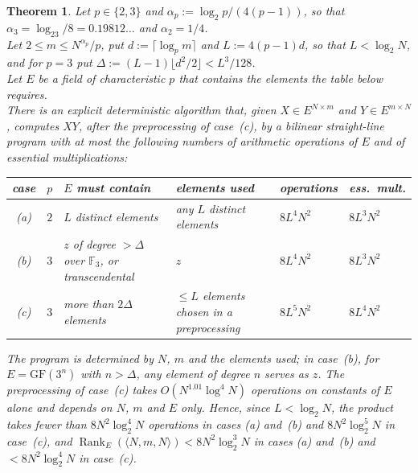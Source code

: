 \documentclass[11pt]{article}
\newtheorem{theorem}{Theorem}[section]
\theoremstyle{definition}
\theoremstyle{remark}
\newcommand{\F}{\mathbb{F}}
\newcommand{\GF}{\mathrm{GF}}
\newcommand{\Rank}{\operatorname{Rank}}
\begin{document}
\begin{theorem}\label{thm:main}
Let $p\in\{2,3\}$ and $\alpha_p:=\log_2p/(4(p-1))$, so that $\alpha_3=\log_23/8=0.19812\ldots$ and $\alpha_2=1/4$.\\
Let $2\le m\le N^{\alpha_p}/p$, put $d:=\lceil\log_pm\rceil$ and $L:=4(p-1)d$, so that $L<\log_2N$, and for $p=3$ put $\Delta:=(L-1)\lfloor d^2/2\rfloor<L^3/128$.\\
Let $E$ be a field of characteristic $p$ that contains the elements the table below requires.\\
There is an explicit deterministic algorithm that, given $X\in E^{N\times m}$ and $Y\in E^{m\times N}$, computes $XY$, after the preprocessing of case~(c), by a bilinear straight-line program with at most the following numbers of arithmetic operations of $E$ and of essential multiplications:
\begin{center}\small
\begin{tabular}{@{}cc>{\raggedright\arraybackslash}p{3.6cm}>{\raggedright\arraybackslash}p{3.6cm}ll@{}}
\toprule
case & $p$ & $E$ must contain & elements used & operations & ess.\ mult.\\
\midrule
(a) & $2$ & $L$ distinct elements & any $L$ distinct elements & $8L^4N^2$ & $8L^3N^2$\\
(b) & $3$ & $z$ of degree $>\Delta$ over $\F_3$, or transcendental & $z$ & $8L^4N^2$ & $8L^3N^2$\\
(c) & $3$ & more than $2\Delta$ elements & $\le L$ elements chosen in a preprocessing & $8L^5N^2$ & $8L^4N^2$\\
\bottomrule
\end{tabular}
\end{center}
The program is determined by $N$, $m$ and the elements used; in case~(b), for $E=\GF(3^n)$ with $n>\Delta$, any element of degree $n$ serves as $z$. The preprocessing of case~(c) takes $O(N^{1.01}\log^4N)$ operations on constants of $E$ alone and depends on $N$, $m$ and $E$ only. Hence, since $L<\log_2N$, the product takes fewer than $8N^2\log_2^4N$ operations in cases (a) and~(b) and $8N^2\log_2^5N$ in case~(c), and $\Rank_E(\langle N,m,N\rangle)<8N^2\log_2^3N$ in cases (a) and~(b) and $<8N^2\log_2^4N$ in case~(c).
\end{theorem}
\end{document}
